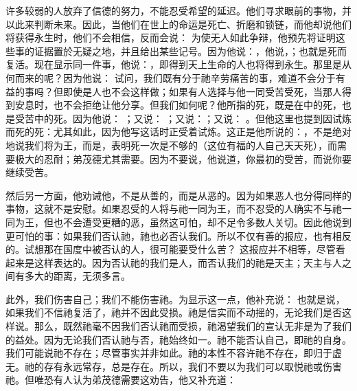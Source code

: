 许多较弱的人放弃了信德的努力，不能忍受希望的延迟。他们寻求眼前的事物，并以此来判断未来。因此，当他们在世上的命运是死亡、折磨和锁链，而他却说他们将获得永生时，他们不会相信，反而会说： 为使无人如此争辩，他预先将证明这些事的证据置於无疑之地，并且给出某些记号。因为他说：，他说，；也就是死而复活。现在显示同一件事，他说：，即得到天上生命的人也将得到永生。那里是从何而来的呢？因为他说： 试问，我们既有分于祂辛劳痛苦的事，难道不会分于有益的事吗？但即使是人也不会这样做；如果有人选择与他一同受苦受死，当那人得到安息时，也不会拒绝让他分享。但我们如何呢？他所指的死，既是在中的死，也是受苦中的死。因为他说： ；又说： ；又说：；又说： 。但他这里也提到因试炼而死的死：尤其如此，因为他写这话时正受着试炼。这正是他所说的：，不是绝对地说我们将为王，而是，表明死一次是不够的（这位有福的人自己天天死），而需要极大的忍耐；弟茂德尤其需要。因为不要说，他说道，你最初的受苦，而说你要继续受苦。\par

然后另一方面，他劝诫他，不是从善的，而是从恶的。因为如果恶人也分得同样的事物，这就不是安慰。如果忍受的人将与祂一同为王，而不忍受的人确实不与祂一同为王，但也不会遭受更糟的恶，虽然这可怕，却不足令多数人关切。因此他说到更可怕的事：如果我们否认祂，祂也必否认我们。所以不仅有善的报应，也有相反的。试想那在国度中被否认的人，很可能要受什么苦？  这报应并不相等，尽管看起来是这样表达的。因为否认祂的我们是人，而否认我们的祂是天主；天主与人之间有多大的距离，无须多言。\par

此外，我们伤害自己；我们不能伤害祂。为显示这一点，他补充说： 也就是说，如果我们不信祂复活了，祂并不因此受损。祂是信实而不动摇的，无论我们是否这样说。那么，既然祂毫不因我们否认祂而受损，祂渴望我们的宣认无非是为了我们的益处。因为无论我们否认祂与否，祂始终如一。祂不能否认自己，即祂的自身。我们可能说祂不存在；尽管事实并非如此。祂的本性不容许祂不存在，即归于虚无。祂的存有永远常存，总是存在。所以，我们不要以为我们可以取悦祂或伤害祂。但唯恐有人认为弟茂德需要这劝告，他又补充道：\par

